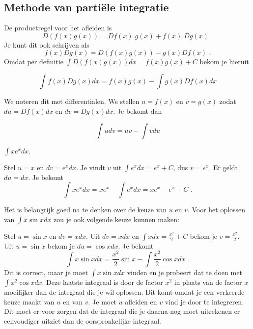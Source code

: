 \subsection{Methode van parti\"ele integratie}

De productregel voor het afleiden is
\[
D(f(x)g(x))=Df(x).g(x)+f(x).Dg(x) \text { .}
\]
Je kunt dit ook schrijven als
\[
f(x)Dg(x)=D(f(x)g(x))-g(x)Df(x) \text { .}
\]
Omdat per definitie $\int D(f(x)g(x))dx = f(x)g(x)+C$ bekom je hieruit \vspace{5mm}

\[
\int f(x)Dg(x)dx=f(x)g(x)-\int g(x)Df(x)dx
\]


We noteren dit met differentialen.
We stellen $u=f(x)$ en $v=g(x)$ zodat $du=Df(x)dx$ en $dv=Dg(x)dx$.
Je bekomt dan \vspace{5mm}

		\[
		\int udv=uv-\int vdu
		\]

%
%


\begin{voorbeeld}
$\int x e^x dx$.

Stel $u=x$ en $dv=e^xdx$.
Je vindt $v$ uit $\int e^xdx=e^x+C$, dus $v=e^x$.
Er geldt $du=dx$.
Je bekomt
\[
\int xe^xdx=xe^x-\int e^xdx=xe^x-e^x+C \text { .}
\]
\vspace{2mm}

Het is belangrijk goed na te denken over de keuze van $u$ en $v$. Voor het oplossen van $\int x \sin x dx$ zou je ook volgende keuze kunnen maken:

Stel $u=\sin x$ en $dv=xdx$.
Uit $dv=xdx$ en $\int xdx = \frac{x^2}{2}+C$ bekom je $v=\frac{x^2}{2}$.
Uit $u=\sin x$ bekom je $du=\cos x dx$.
Je bekomt
\[
\int x \sin x dx=\frac{x^2}{2} \sin x-\int \frac{x^2}{2} \cos x dx \text { .}
\]
Dit is correct, maar je moet $\int x \sin x dx$ vinden en je probeert dat te doen met $\int x^2 \cos xdx$.
Deze laatste integraal is door de factor $x^2$ in plaats van de factor $x$ moeilijker dan de integraal die je wil oplossen.
Dit komt omdat je een verkeerde keuze maakt van $u$ en van $v$.
Je  moet $u$ afleiden en $v$ vind je door te integreren.
Dit moet er voor zorgen dat de integraal die je daarna nog moet uitrekenen er eenvoudiger uitziet dan de oorspronkelijke integraal.\\
\end{voorbeeld}

